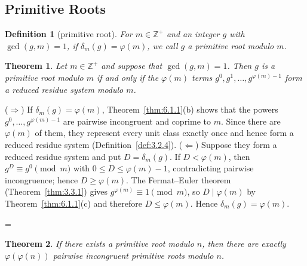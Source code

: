 \documentclass[11pt]{article}
\makeatletter
\theoremstyle{ntstyle}
\newtheorem{theorem}{Theorem}[subsection]
\newtheorem{definition}{Definition}[subsection]
\let\nt@closedisplay\]
\def\nt@guardedclose{\@ifnextchar\par{\nt@closeafterpar}{\@ifnextchar\end{\postdisplaypenalty\@M\nt@closedisplay}{\nt@closedisplay}}}
\def\nt@closeafterpar\par{\@ifnextchar\par{\nt@closeafterpar}{\@ifnextchar\end{\postdisplaypenalty\@M\nt@closedisplay\par}{\nt@closedisplay\par}}}
\renewenvironment{proof}[1][\proofname]{\par
  \pushQED{\qed}\normalfont\topsep\medskipamount\edef\nt@afterproof{\@endparpenalty=\the\@endparpenalty\relax}\@beginparpenalty\@M\@endparpenalty\@M\let\]\nt@guardedclose\trivlist\item[]\textit{#1\@addpunct{.}} \ignorespaces}{\ifvmode\addpenalty\@M\fi\popQED\nt@afterproof\endtrivlist\@endpefalse}
\makeatother
\begin{document}
\subsection{Primitive Roots}

\begin{definition}[primitive root]\label{def:6.2.1} For $m \in
		\mathbb{Z}^+$ and an integer $g$ with $\gcd(g, m) = 1$, if $\delta_m(g) =
		\varphi(m)$, we call $g$ a primitive root modulo $m$.

\end{definition}
\begin{theorem}\label{thm:6.2.1} Let $m \in \mathbb{Z}^+$ and
	suppose that $\gcd(g, m) = 1$. Then $g$ is a primitive root modulo $m$ if and only
	if the $\varphi(m)$ terms $g^{0}, g^{1}, \ldots, g^{\varphi(m) - 1}$
	form a reduced residue system modulo $m$.

\end{theorem}

\begin{proof} ($\Rightarrow$) If $\delta_m(g) =
		\varphi(m)$, Theorem~\ref{thm:6.1.1}(b) shows that the powers $g^{0}, \ldots,
		g^{\varphi(m) - 1}$ are pairwise incongruent and coprime to $m$. Since there are
	$\varphi(m)$ of them, they represent every unit class exactly once and
	hence form a reduced residue system (Definition~\ref{def:3.2.4}).
	($\Leftarrow$) Suppose they form a reduced residue system and put $D =
		\delta_m(g)$. If $D < \varphi(m)$, then $g^{D} \equiv g^{0} \pmod{m}$
	with $0 \le D \le \varphi(m) - 1$, contradicting pairwise
	incongruence; hence $D \ge \varphi(m)$. The Fermat--Euler theorem (Theorem~\ref{thm:3.3.1}) gives
	$g^{\varphi(m)} \equiv 1 \pmod{m}$, so $D \mid \varphi(m)$ by Theorem~\ref{thm:6.1.1}(c) and therefore $D \le \varphi(m)$. Hence $\delta_m(g) =
		\varphi(m)$.

\end{proof}
\begin{theorem}\label{thm:6.2.2} If there exists a primitive root
	modulo $n$, then there are exactly $\varphi(\varphi(n))$ pairwise
	incongruent primitive roots modulo $n$.

\end{theorem}
\end{document}
